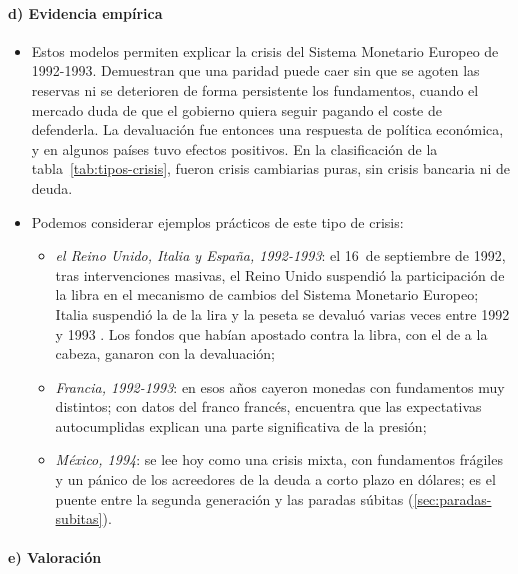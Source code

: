 \documentclass[11pt]{article}
\begin{document}
\paragraph{d) Evidencia empírica}

\begin{itemize}
\item Estos modelos permiten explicar la crisis del Sistema Monetario Europeo de 1992-1993. Demuestran que una paridad puede caer sin que se agoten las reservas ni se deterioren de forma persistente los fundamentos, cuando el mercado duda de que el gobierno quiera seguir pagando el coste de defenderla. La devaluación fue entonces una respuesta de política económica, y en algunos países tuvo efectos positivos. En la clasificación de la tabla~\ref{tab:tipos-crisis}, fueron crisis cambiarias puras, sin crisis bancaria ni de deuda.
\item Podemos considerar ejemplos prácticos de este tipo de crisis:
  \begin{itemize}
  \item \emph{el Reino Unido, Italia y España, 1992-1993}: el 16~de septiembre de 1992, tras intervenciones masivas, el Reino Unido suspendió la participación de la libra en el mecanismo de cambios del Sistema Monetario Europeo\nocite{BoE1992Operation}; Italia suspendió la de la lira y la peseta se devaluó varias veces entre 1992 y 1993\nocite{EichengreenWyplosz1993Unstable}  . Los fondos que habían apostado contra la libra, con el de  a la cabeza, ganaron con la devaluación;
  \item \emph{Francia, 1992-1993}: en esos años cayeron monedas con fundamentos muy distintos; con datos del franco francés, \textcite{Jeanne1997Test} encuentra que las expectativas autocumplidas explican una parte significativa de la presión;
  \item \emph{México, 1994}: se lee hoy como una crisis mixta, con fundamentos frágiles y un pánico de los acreedores de la deuda a corto plazo en dólares; es el puente entre la segunda generación y las paradas súbitas (\ref{sec:paradas-subitas}).
  \end{itemize}
\end{itemize}

\paragraph{e) Valoración}
\end{document}
